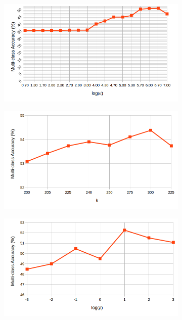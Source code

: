 \begin{figure}[!h]
\begin{subfigure}[b]{0.3\linewidth}
  \end{subfigure}
    \begin{subfigure}[b]{0.3\linewidth}
    \includegraphics[width=\linewidth]{images/simple_gamma_birds.png}
  \end{subfigure}
  \begin{subfigure}[b]{0.3\linewidth}
    \includegraphics[width=\linewidth]{images/simple_k_birds.png}
  \end{subfigure}
    \begin{subfigure}[b]{0.3\linewidth}
    \includegraphics[width=\linewidth]{images/simple_beta_birds.png}

\end{subfigure}
\end{figure}
